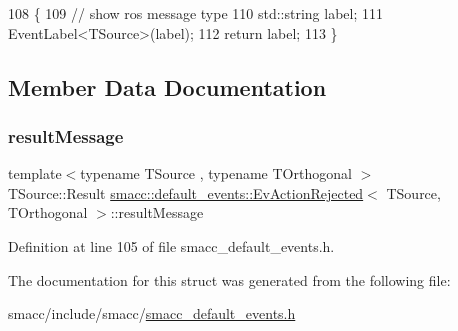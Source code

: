 \begin{DoxyCode}
108   \{
109     \textcolor{comment}{// show ros message type}
110     std::string label;
111     EventLabel<TSource>(label);
112     \textcolor{keywordflow}{return} label;
113   \}
\end{DoxyCode}


\subsection{Member Data Documentation}
\mbox{\label{structsmacc_1_1default__events_1_1EvActionRejected_a237f31400f782599840099b1668fea66}} 
\subsubsection{\texorpdfstring{result\+Message}{resultMessage}}
{\footnotesize\ttfamily template$<$typename T\+Source , typename T\+Orthogonal $>$ \\
T\+Source\+::\+Result \hyperlink{structsmacc_1_1default__events_1_1EvActionRejected}{smacc\+::default\+\_\+events\+::\+Ev\+Action\+Rejected}$<$ T\+Source, T\+Orthogonal $>$\+::result\+Message}



Definition at line 105 of file smacc\+\_\+default\+\_\+events.\+h.



The documentation for this struct was generated from the following file\+:\begin{DoxyCompactItemize}
\item 
smacc/include/smacc/\hyperlink{smacc__default__events_8h}{smacc\+\_\+default\+\_\+events.\+h}\end{DoxyCompactItemize}
